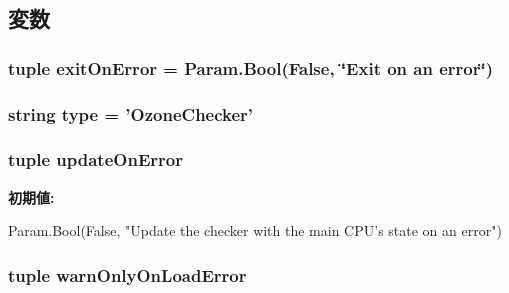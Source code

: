 \subsection{変数}
\hypertarget{classOzoneChecker_1_1OzoneChecker_ae3f9ab8da88c7ebfba47692201291bed}{
\subsubsection[{exitOnError}]{\setlength{\rightskip}{0pt plus 5cm}tuple {\bf exitOnError} = Param.Bool(False, \char`\"{}Exit on an error\char`\"{})}}
\label{classOzoneChecker_1_1OzoneChecker_ae3f9ab8da88c7ebfba47692201291bed}
\hypertarget{classOzoneChecker_1_1OzoneChecker_acce15679d830831b0bbe8ebc2a60b2ca}{
\subsubsection[{type}]{\setlength{\rightskip}{0pt plus 5cm}string {\bf type} = '{\bf OzoneChecker}'}}
\label{classOzoneChecker_1_1OzoneChecker_acce15679d830831b0bbe8ebc2a60b2ca}
\hypertarget{classOzoneChecker_1_1OzoneChecker_aad41d3eb2d73f3e7035d73c73bf92523}{
\subsubsection[{updateOnError}]{\setlength{\rightskip}{0pt plus 5cm}tuple {\bf updateOnError}}}
\label{classOzoneChecker_1_1OzoneChecker_aad41d3eb2d73f3e7035d73c73bf92523}
{\bfseries 初期値:}
\begin{DoxyCode}
Param.Bool(False,
        "Update the checker with the main CPU's state on an error")
\end{DoxyCode}
\hypertarget{classOzoneChecker_1_1OzoneChecker_a2c725933b14b9d3c867f1ab31a36274e}{
\subsubsection[{warnOnlyOnLoadError}]{\setlength{\rightskip}{0pt plus 5cm}tuple {\bf warnOnlyOnLoadError}}}
